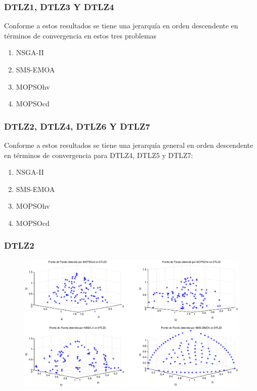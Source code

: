 \documentclass[10pt,compress]{beamer}
\begin{document}
\begin{frame}
	\frametitle{DTLZ1, DTLZ3 Y DTLZ4}
\begin{block}{Conforme a estos resultados se tiene una jerarqu\'ia en orden descendente en t\'erminos de convergencia en estos tres 
  problemas}

\begin{enumerate}
  \item NSGA-II
  \item SMS-EMOA
  \item MOPSOhv
  \item MOPSOcd
\end{enumerate}
\end{block}
\end{frame}
\begin{frame}
	\frametitle{DTLZ2, DTLZ4, DTLZ6 Y DTLZ7}
	\begin{block}{ Conforme a estos resultados se tiene una jerarqu\'ia general en orden descendente en t\'erminos de convergencia para  
 DTLZ4, DTLZ5 y DTLZ7:}

\begin{enumerate}
  \item  NSGA-II
  \item SMS-EMOA
  \item MOPSOhv
  \item MOPSOcd
\end{enumerate}
\end{block}
\end{frame}
\begin{frame}
	\frametitle{DTLZ2}
	\begin{figure}
      \begin{center}
	  \includegraphics[scale=0.3]{rdtlz2r.eps}
      \end{center}      
      \end{figure}
\end{frame}
\end{document}
